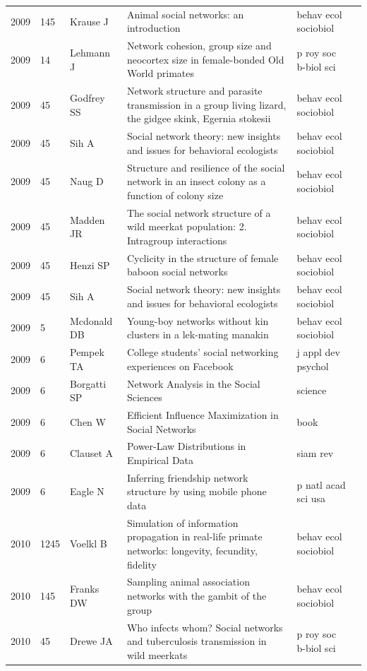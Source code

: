 \documentclass[11pt]{article} %
\begin{document}
\begin{landscape}
\begin{longtable}{p{0.7cm}|p{0.8cm}|p{3cm}|p{14.5cm}|p{3.5cm}l}
2009& 	145& 	 Krause J& 	 Animal social networks: an introduction& 	 behav ecol sociobiol\\
2009& 	14& 	 Lehmann J& 	 Network cohesion, group size and neocortex size in female-bonded Old World primates& 	 p roy soc b-biol sci\\
2009& 	45& 	 Godfrey SS& 	 Network structure and parasite transmission in a group living lizard, the gidgee skink, Egernia stokesii& 	 behav ecol sociobiol\\
2009& 	45& 	 Sih A& 	 Social network theory: new insights and issues for behavioral ecologists& 	 behav ecol sociobiol\\
2009& 	45& 	 Naug D& 	 Structure and resilience of the social network in an insect colony as a function of colony size& 	 behav ecol sociobiol\\
2009& 	45& 	 Madden JR& 	 The social network structure of a wild meerkat population: 2. Intragroup interactions& 	 behav ecol sociobiol\\
2009& 	45& 	 Henzi SP& 	 Cyclicity in the structure of female baboon social networks& 	 behav ecol sociobiol\\
2009& 	45& 	 Sih A& 	 Social network theory: new insights and issues for behavioral ecologists& 	 behav ecol sociobiol\\
2009& 	5& 	 Mcdonald DB& 	 Young-boy networks without kin clusters in a lek-mating manakin& 	 behav ecol sociobiol\\
2009& 	6& 	 Pempek TA& 	 College students' social networking experiences on Facebook& 	 j appl dev psychol\\
2009& 	6& 	 Borgatti SP& 	 Network Analysis in the Social Sciences& 	 science\\
2009& 	6& 	 Chen W& 	 Efficient Influence Maximization in Social Networks& 	 book\\
2009& 	6& 	 Clauset A& 	 Power-Law Distributions in Empirical Data& 	 siam rev\\
2009& 	6& 	 Eagle N& 	 Inferring friendship network structure by using mobile phone data& 	 p natl acad sci usa\\
2010& 	1245& 	 Voelkl B& 	 Simulation of information propagation in real-life primate networks: longevity, fecundity, fidelity& 	 behav ecol sociobiol\\
2010& 	145& 	 Franks DW& 	 Sampling animal association networks with the gambit of the group& 	 behav ecol sociobiol\\
2010& 	45& 	 Drewe JA& 	 Who infects whom? Social networks and tuberculosis transmission in wild meerkats& 	 p roy soc b-biol sci\\

\end{longtable}
\end{landscape}
\end{document}
